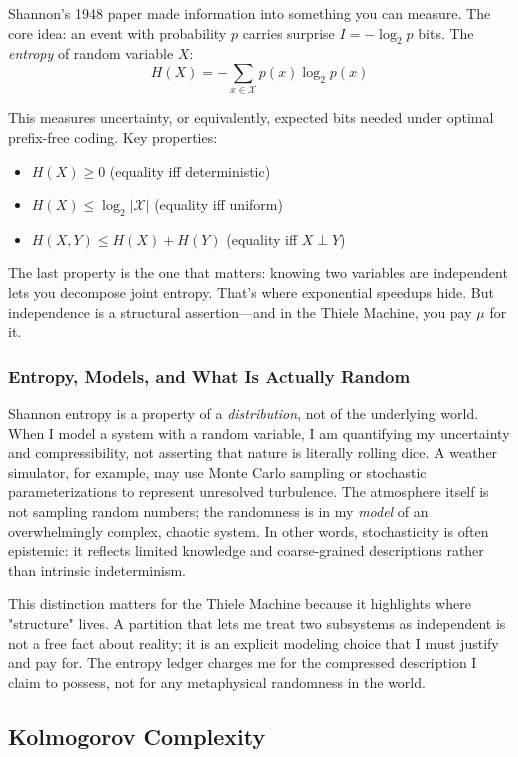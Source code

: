 Shannon's 1948 paper \cite{shannon1948mathematical} made information into something you can measure. The core idea: an event with probability $p$ carries surprise $I = -\log_2 p$ bits. The \textit{entropy} of random variable $X$:
\[
H(X) = -\sum_{x \in \mathcal{X}} p(x) \log_2 p(x)
\]

This measures uncertainty, or equivalently, expected bits needed under optimal prefix-free coding. Key properties:
\begin{itemize}
    \item $H(X) \ge 0$ (equality iff deterministic)
    \item $H(X) \le \log_2 |\mathcal{X}|$ (equality iff uniform)
    \item $H(X, Y) \le H(X) + H(Y)$ (equality iff $X \perp Y$)
\end{itemize}

The last property is the one that matters: knowing two variables are independent lets you decompose joint entropy. That's where exponential speedups hide. But independence is a structural assertion---and in the Thiele Machine, you pay $\mu$ for it.

\subsubsection{Entropy, Models, and What Is Actually Random}

Shannon entropy is a property of a \emph{distribution}, not of the underlying world. When I model a system with a random variable, I am quantifying my uncertainty and compressibility, not asserting that nature is literally rolling dice. A weather simulator, for example, may use Monte Carlo sampling or stochastic parameterizations to represent unresolved turbulence. The atmosphere itself is not sampling random numbers; the randomness is in my \emph{model} of an overwhelmingly complex, chaotic system. In other words, stochasticity is often epistemic: it reflects limited knowledge and coarse-grained descriptions rather than intrinsic indeterminism.

This distinction matters for the Thiele Machine because it highlights where "structure" lives. A partition that lets me treat two subsystems as independent is not a free fact about reality; it is an explicit modeling choice that I must justify and pay for. The entropy ledger charges me for the compressed description I claim to possess, not for any metaphysical randomness in the world.

\subsection{Kolmogorov Complexity}

